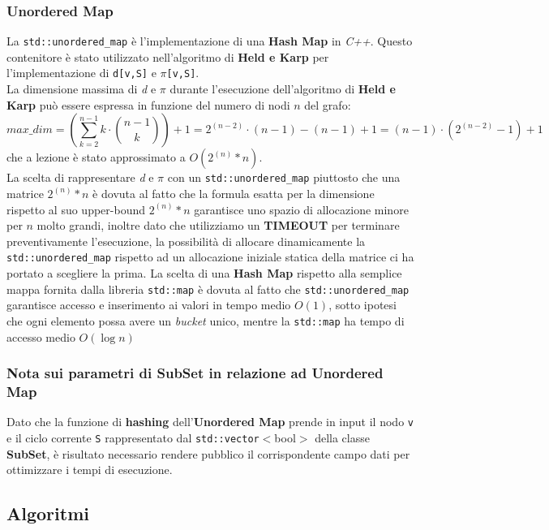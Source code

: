 \documentclass[]{article}
\begin{document}
\subsubsection{Unordered Map}
La \verb|std::unordered_map| è l'implementazione di una \textbf{Hash Map} in \textit{C++}. Questo contenitore è stato utilizzato nell'algoritmo di \textbf{Held e Karp} per l'implementazione di \verb|d[v,S]| e $\pi$\verb|[v,S]|.\\
La dimensione massima di \textit{d} e $\pi$ durante l'esecuzione dell'algoritmo di \textbf{Held e Karp} può essere espressa in funzione del numero di nodi $n$ del grafo:
$$max\_dim = (\sum_{k=2}^{n-1}k\cdot\binom{n-1}{k}) + 1 = 2^{(n-2)} \cdot (n-1) - (n-1) +1 = (n-1)\cdot(2^{(n-2)}-1) +1$$ che a lezione è stato approssimato a $O(2^{(n)} * n)$.\\
La scelta di rappresentare \textit{d} e $\pi$ con un \verb|std::unordered_map| piuttosto che una matrice $2^{(n)} * n$ è dovuta al fatto che la formula esatta per la dimensione rispetto al suo upper-bound $2^{(n)} * n$ garantisce uno spazio di allocazione minore per $n$ molto grandi, inoltre dato che utilizziamo un \textbf{TIMEOUT} per terminare preventivamente l'esecuzione, la possibilità di allocare dinamicamente la \verb|std::unordered_map| rispetto ad un allocazione iniziale statica della matrice ci ha portato a scegliere la prima.
La scelta di una \textbf{Hash Map} rispetto alla semplice mappa fornita dalla libreria \verb|std::map| è dovuta al fatto che \verb|std::unordered_map| garantisce accesso e inserimento ai valori in tempo medio $O(1)$, sotto ipotesi che ogni elemento possa avere un \textit{bucket} unico, mentre la \verb|std::map| ha tempo di accesso medio $O(\log{n})$\\
\subsubsection{Nota sui parametri di SubSet in relazione ad Unordered Map}
Dato che la funzione di \textbf{hashing} dell'\textbf{Unordered Map} prende in input il nodo \verb|v| e il ciclo corrente \verb|S| rappresentato dal \verb|std::vector|$<$bool$>$ della classe \textbf{SubSet}, è risultato necessario rendere pubblico il corrispondente campo dati per ottimizzare i tempi di esecuzione.

\newpage
\subsection{Algoritmi}
\end{document}
